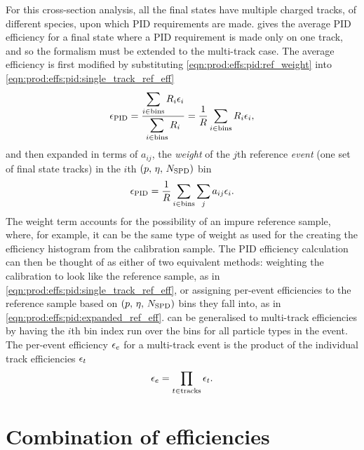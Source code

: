 For this cross-section analysis, all the final states have multiple charged 
tracks, of different species, upon which \ac{PID} requirements are made.
 gives the average \ac{PID} 
efficiency for a final state where a \ac{PID} requirement is made only on one 
track, and so the formalism must be extended to the multi-track case.
The average efficiency is first modified by substituting 
\cref{eqn:prod:effs:pid:ref_weight} into 
\cref{eqn:prod:effs:pid:single_track_ref_eff}
\begin{equation}
  \effpid = \frac{%
    \displaystyle\sum_{i \in \textnormal{bins}} R_{i}\eff_{i}
  }{%
    \displaystyle\sum_{i \in \textnormal{bins}} R_{i}
  }
  = \frac{1}{R}\sum_{i \in \textnormal{bins}} R_{i}\eff_{i},
\end{equation}
and then expanded in terms of $a_{ij}$, the \emph{weight} of the $j$th 
reference \emph{event} (one set of final state tracks) in the $i$th 
$(p,\,\eta,\,N_{\textnormal{SPD}})$ bin
\begin{equation}
  \epsilon_{\textnormal{PID}} = \frac{1}{R}
            \sum_{i \in \textnormal{bins}}\sum_{j} a_{ij}\epsilon_{i}.
  \label{eqn:prod:effs:pid:expanded_ref_eff}
\end{equation}
The weight term accounts for the possibility of an impure reference sample, 
where, for example, it can be the same type of weight as used for the creating 
the efficiency histogram from the calibration sample.
The \ac{PID} efficiency calculation can then be thought of as either of two 
equivalent methods: weighting the calibration to look like the reference 
sample, as in \cref{eqn:prod:effs:pid:single_track_ref_eff}, or assigning 
per-event efficiencies to the reference sample based on 
$(p,\,\eta,\,N_{\textnormal{SPD}})$ bins they fall into, as in 
\cref{eqn:prod:effs:pid:expanded_ref_eff}.
 can be generalised to multi-track 
efficiencies by having the $i$th bin index run over the bins for all particle 
types in the event.
The per-event efficiency $\epsilon_{e}$ for a multi-track event is the product of 
the individual track efficiencies $\epsilon_{t}$
\begin{equation}
  \epsilon_{e} = \prod_{t \in \textnormal{tracks}} \epsilon_{t}.
\end{equation}


\section{Combination of efficiencies}
\label{chap:prod:effs:tot}

